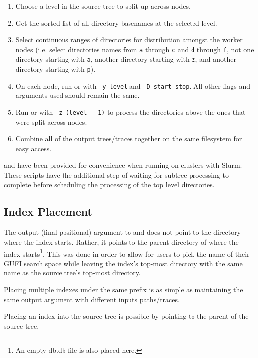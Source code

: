 \begin{enumerate}
\item Choose a level in the source tree to split up across nodes.
\item Get the sorted list of all directory basenames at the selected
  level.
\item Select continuous ranges of directories for distribution amongst
  the worker nodes (i.e. select directories names from \texttt{a}
  through \texttt{c} and \texttt{d} through \texttt{f}, not one
  directory starting with \texttt{a}, another directory starting with
  \texttt{z}, and another directory starting with \texttt{p}).
\item On each node, run \gufidirindex or \gufidirtrace with \texttt{-y
  level} and \texttt{-D start stop}. All other flags and arguments
  used should remain the same.
\item Run \gufidirindex or \gufidirtrace with \texttt{-z (level - 1)}
  to process the directories above the ones that were split across
  nodes.
\item Combine all of the output trees/traces together on the same
  filesystem for easy access.
\end{enumerate}

\gufidirindexdistributed and \gufidirtracedistributed have been
provided for convenience when running on clusters with Slurm. These
scripts have the additional step of waiting for subtree processing to
complete before scheduling the processing of the top level
directories.

\subsection{Index Placement}
The output (final positional) argument to \gufidirindex and
\gufitraceindex does not point to the directory where the index
starts. Rather, it points to the parent directory of where the index
starts\footnote{An empty db.db file is also placed here.}. This was
done in order to allow for users to pick the name of their GUFI search
space while leaving the index's top-most directory with the same name
as the source tree's top-most directory.

Placing multiple indexes under the same prefix is as simple as
maintaining the same output argument with different inputs
paths/traces.

Placing an index into the source tree is possible by pointing
\gufidirindex to the parent of the source tree.

